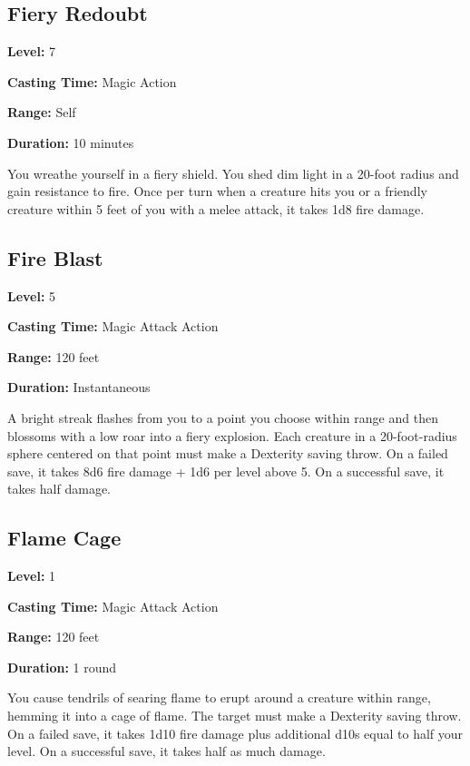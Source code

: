 \documentclass[12pt,letterpaper,twocolumn,openany,nodeprecatedcode,bg=none]{dndbook}
\begin{document}
\clearpage

\subsection{Fiery Redoubt}\label{fiery-redoubt}

\textbf{Level:} 7

\textbf{Casting Time:} Magic Action

\textbf{Range:} Self

\textbf{Duration:} 10 minutes

You wreathe yourself in a fiery shield. You shed dim light in a 20-foot
radius and gain resistance to fire. Once per turn when a creature hits
you or a friendly creature within 5 feet of you with a melee attack, it
takes 1d8 fire damage.

\subsection{Fire Blast}\label{fire-blast}

\textbf{Level:} 5

\textbf{Casting Time:} Magic Attack Action

\textbf{Range:} 120 feet

\textbf{Duration:} Instantaneous

A bright streak flashes from you to a point you choose within range and
then blossoms with a low roar into a fiery explosion. Each creature in a
20-foot-radius sphere centered on that point must make a Dexterity
saving throw. On a failed save, it takes 8d6 fire damage + 1d6 per level
above 5. On a successful save, it takes half damage.

\subsection{Flame Cage}\label{flame-cage}

\textbf{Level:} 1

\textbf{Casting Time:} Magic Attack Action

\textbf{Range:} 120 feet

\textbf{Duration:} 1 round

You cause tendrils of searing flame to erupt around a creature within
range, hemming it into a cage of flame. The target must make a Dexterity
saving throw. On a failed save, it takes 1d10 fire damage plus
additional d10s equal to half your level. On a successful save, it takes
half as much damage.
\end{document}
